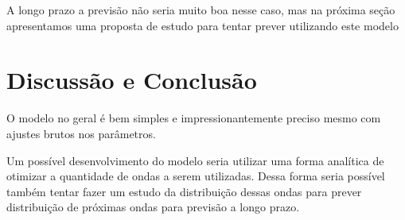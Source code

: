 \documentclass{article}
\begin{document}
A longo prazo a previsão não seria muito boa nesse caso, mas na próxima seção apresentamos uma proposta de estudo para tentar prever utilizando este modelo

\section{Discussão e Conclusão}

O modelo no geral é bem simples e impressionantemente preciso mesmo com ajustes brutos nos parâmetros.

Um possível desenvolvimento do modelo seria utilizar uma forma analítica de otimizar a quantidade de ondas a serem utilizadas. Dessa forma seria possível também tentar fazer um estudo da distribuição dessas ondas para prever distribuição de próximas ondas para previsão a longo prazo.


\nocite{*}



\end{document}
